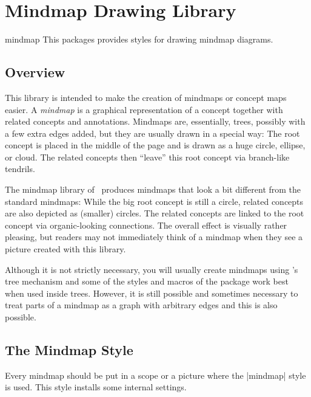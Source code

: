%
%
%

\section{Mindmap Drawing Library}

\begin{tikzlibrary}{mindmap}
  This packages provides styles for drawing mindmap diagrams.
\end{tikzlibrary}

\subsection{Overview}

This library is intended to make the creation of mindmaps or concept
maps easier. A \emph{mindmap} is a graphical representation of a
concept together
with related concepts and annotations. Mindmaps are, essentially,
trees, possibly with a few extra edges added, but they are usually
drawn in a special way: The root concept is placed in the middle of
the page and is drawn as a huge circle, ellipse, or cloud. The related
concepts then ``leave'' this root concept via branch-like tendrils.

The mindmap library of \tikzname\ produces mindmaps that look a bit
different from the standard mindmaps: While the big root concept is
still a circle, related concepts are also depicted as (smaller)
circles. The related concepts are linked to the root concept via
organic-looking connections. The overall effect is visually rather
pleasing, but readers may not immediately think of a mindmap when they
see a picture created with this library.

Although it is not strictly necessary, you will usually create
mindmaps using \tikzname's tree mechanism and some of the styles and
macros of the package work best when used inside trees. However, it is
still possible and sometimes necessary to treat parts of a mindmap as
a graph with arbitrary edges and this is also possible.


\subsection{The Mindmap Style}

Every mindmap should be put in a scope or a picture where the
|mindmap| style is used. This style installs some internal settings.

